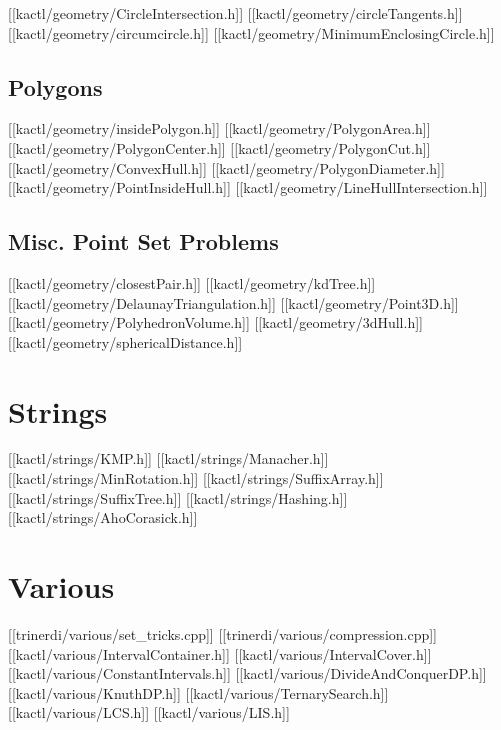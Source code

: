 [[kactl/geometry/CircleIntersection.h]]
[[kactl/geometry/circleTangents.h]]
[[kactl/geometry/circumcircle.h]]
[[kactl/geometry/MinimumEnclosingCircle.h]]

\section{Polygons}

[[kactl/geometry/insidePolygon.h]]
[[kactl/geometry/PolygonArea.h]]
[[kactl/geometry/PolygonCenter.h]]
[[kactl/geometry/PolygonCut.h]]
[[kactl/geometry/ConvexHull.h]]
[[kactl/geometry/PolygonDiameter.h]]
[[kactl/geometry/PointInsideHull.h]]
[[kactl/geometry/LineHullIntersection.h]]

\section{Misc. Point Set Problems}

[[kactl/geometry/closestPair.h]]
[[kactl/geometry/kdTree.h]]
[[kactl/geometry/DelaunayTriangulation.h]]
[[kactl/geometry/Point3D.h]]
[[kactl/geometry/PolyhedronVolume.h]]
[[kactl/geometry/3dHull.h]]
[[kactl/geometry/sphericalDistance.h]]

\chapter{Strings}

[[kactl/strings/KMP.h]]
[[kactl/strings/Manacher.h]]
[[kactl/strings/MinRotation.h]]
[[kactl/strings/SuffixArray.h]]
[[kactl/strings/SuffixTree.h]]
[[kactl/strings/Hashing.h]]
[[kactl/strings/AhoCorasick.h]]

\chapter{Various}

[[trinerdi/various/set_tricks.cpp]]
[[trinerdi/various/compression.cpp]]
[[kactl/various/IntervalContainer.h]]
[[kactl/various/IntervalCover.h]]
[[kactl/various/ConstantIntervals.h]]
[[kactl/various/DivideAndConquerDP.h]]
[[kactl/various/KnuthDP.h]]
[[kactl/various/TernarySearch.h]]
[[kactl/various/LCS.h]]
[[kactl/various/LIS.h]]

\singlecolumn
\bye
